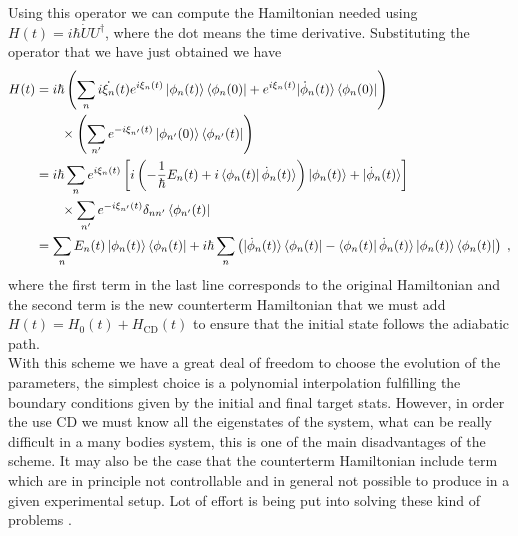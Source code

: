Using this operator we can compute the Hamiltonian needed using $H(t)=i\hbar \dot{U}U^\dag$,  where the dot means the time derivative. Substituting the operator that we have just obtained we have
\begin{equation}
	\begin{split}
	H(t)&=i\hbar\left(\sum_ni\dot{\xi_n}(t)e^{i\xi_n(t)}\ket{\phi_n(t)}\bra{\phi_n(0)}+e^{i\xi_n(t)}|\dot{\phi}_n(t)\rangle\bra{\phi_n(0)}\right)\\
	&\phantom{=i\hbar}\times\left(\sum_{n'}e^{-i\xi_{n'}(t)}\ket{\phi_{n'}(0)}\bra{\phi_{n'}(t)}\right)\\
	&=i\hbar\sum_ne^{i\xi_n(t)}\left[i\left(-\frac{1}{\hbar}E_n(t)+i\bra{\phi_n(t)}\dot{\phi}_n(t)\rangle\right)\ket{\phi_n(t)}+|\dot{\phi}_n(t)\rangle\right]\\
	&\phantom{=i\hbar}\times\sum_{n'}e^{-i\xi_{n'}(t)}\delta_{nn'}\bra{\phi_{n'}(t)}\\
	&=\sum_nE_n(t)\ket{\phi_n(t)}\bra{\phi_n(t)}+i\hbar\sum_n\left(|\dot{\phi}_n(t)\rangle\bra{\phi_n(t)}-\bra{\phi_n(t)}\dot{\phi}_n(t)\rangle\ket{\phi_n(t)}\bra{\phi_n(t)}\right)\; ,
	\end{split}
\end{equation}
where the first term in the last line corresponds to the original Hamiltonian and the second term is the new counterterm Hamiltonian that we must add $H(t)=H_0(t)+H_{\text{CD}}(t)$ to ensure that the initial state follows the adiabatic path.\\

With this scheme we have a great deal of freedom to choose the evolution of the parameters, the simplest choice is a polynomial interpolation fulfilling the boundary conditions given by the initial and final target stats. However, in order the use CD we must know all the eigenstates of the system, what can be really difficult in a  many bodies system, this is one of the main disadvantages of the scheme. It may also be the case that the counterterm Hamiltonian include term which are in principle not controllable and in general not possible to produce in a given experimental setup. Lot of effort is being put into solving these kind of problems \cite{Ibanez2011,Chen2017,Petiziol2018,Baksic2016}.

